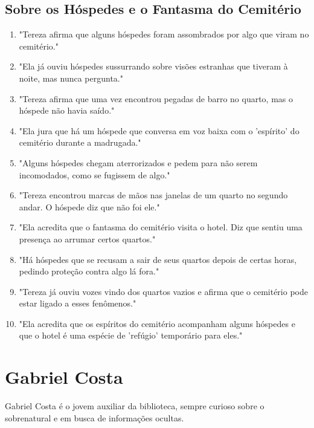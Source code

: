 \subsection*{Sobre os Hóspedes e o Fantasma do Cemitério}
\begin{enumerate}
    \item "Tereza afirma que alguns hóspedes foram assombrados por algo que viram no cemitério."
    \item "Ela já ouviu hóspedes sussurrando sobre visões estranhas que tiveram à noite, mas nunca pergunta."
    \item "Tereza afirma que uma vez encontrou pegadas de barro no quarto, mas o hóspede não havia saído."
    \item "Ela jura que há um hóspede que conversa em voz baixa com o 'espírito' do cemitério durante a madrugada."
    \item "Alguns hóspedes chegam aterrorizados e pedem para não serem incomodados, como se fugissem de algo."
    \item "Tereza encontrou marcas de mãos nas janelas de um quarto no segundo andar. O hóspede diz que não foi ele."
    \item "Ela acredita que o fantasma do cemitério visita o hotel. Diz que sentiu uma presença ao arrumar certos quartos."
    \item "Há hóspedes que se recusam a sair de seus quartos depois de certas horas, pedindo proteção contra algo lá fora."
    \item "Tereza já ouviu vozes vindo dos quartos vazios e afirma que o cemitério pode estar ligado a esses fenômenos."
    \item "Ela acredita que os espíritos do cemitério acompanham alguns hóspedes e que o hotel é uma espécie de 'refúgio' temporário para eles."
\end{enumerate}

\section{Gabriel Costa}
Gabriel Costa é o jovem auxiliar da biblioteca, sempre curioso sobre o sobrenatural e em busca de informações ocultas.

